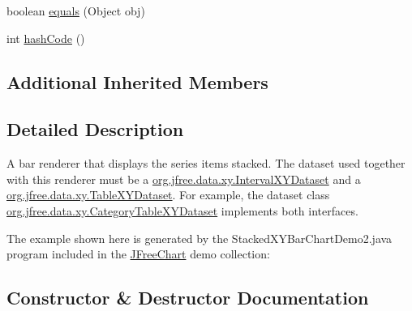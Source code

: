 \begin{DoxyCompactItemize}
\item 
boolean \mbox{\hyperlink{classorg_1_1jfree_1_1chart_1_1renderer_1_1xy_1_1_stacked_x_y_bar_renderer_a11782a2f26229f68f7d9996f0e44d82c}{equals}} (Object obj)
\item 
int \mbox{\hyperlink{classorg_1_1jfree_1_1chart_1_1renderer_1_1xy_1_1_stacked_x_y_bar_renderer_a90b4795990e71c113b2ec8f58631ad62}{hash\+Code}} ()
\end{DoxyCompactItemize}
\subsection*{Additional Inherited Members}


\subsection{Detailed Description}
A bar renderer that displays the series items stacked. The dataset used together with this renderer must be a \mbox{\hyperlink{interfaceorg_1_1jfree_1_1data_1_1xy_1_1_interval_x_y_dataset}{org.\+jfree.\+data.\+xy.\+Interval\+X\+Y\+Dataset}} and a \mbox{\hyperlink{interfaceorg_1_1jfree_1_1data_1_1xy_1_1_table_x_y_dataset}{org.\+jfree.\+data.\+xy.\+Table\+X\+Y\+Dataset}}. For example, the dataset class \mbox{\hyperlink{classorg_1_1jfree_1_1data_1_1xy_1_1_category_table_x_y_dataset}{org.\+jfree.\+data.\+xy.\+Category\+Table\+X\+Y\+Dataset}} implements both interfaces.

The example shown here is generated by the {\ttfamily Stacked\+X\+Y\+Bar\+Chart\+Demo2.\+java} program included in the \mbox{\hyperlink{classorg_1_1jfree_1_1chart_1_1_j_free_chart}{J\+Free\+Chart}} demo collection\+: ~\newline
~\newline
  

\subsection{Constructor \& Destructor Documentation}
\mbox{\label{classorg_1_1jfree_1_1chart_1_1renderer_1_1xy_1_1_stacked_x_y_bar_renderer_a48feeedc28faecf6ecab5df85003e00d}} 
